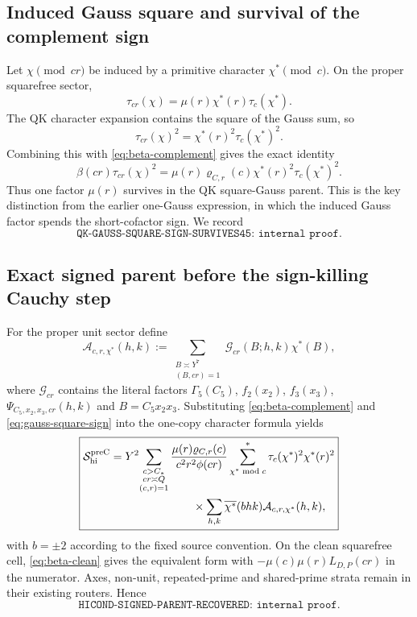 \documentclass[11pt]{article}
\theoremstyle{definition}
\newcommand{\1}{\mathbf 1}
\begin{document}
\subsection{Induced Gauss square and survival of the complement sign}

Let $\chi\pmod{cr}$ be induced by a primitive character
$\chi^*\pmod c$.  On the proper squarefree sector,
\begin{equation}
   \tau_{cr}(\chi)=\mu(r)\chi^*(r)\tau_c(\chi^*).
   \label{eq:induced-gauss}
\end{equation}
The QK character expansion contains the square of the Gauss sum, so
\[
   \tau_{cr}(\chi)^2
   =\chi^*(r)^2\tau_c(\chi^*)^2.
\]
Combining this with \eqref{eq:beta-complement} gives the exact identity
\begin{equation}
  \boxed{
  \beta(cr)\tau_{cr}(\chi)^2
   =
  \mu(r)\varrho_{C,r}(c)\chi^*(r)^2\tau_c(\chi^*)^2.
  }
  \label{eq:gauss-square-sign}
\end{equation}
Thus one factor $\mu(r)$ survives in the QK square-Gauss parent.  This is the
key distinction from the earlier one-Gauss expression, in which the induced
Gauss factor spends the short-cofactor sign.  We record
\[
 \boxed{\texttt{QK-GAUSS-SQUARE-SIGN-SURVIVES45: internal proof}.}
\]

\subsection{Exact signed parent before the sign-killing Cauchy step}

For the proper unit sector define
\[
 \mathcal A_{c,r,\chi^*}(h,k)
 :=
 \sum_{\substack{B\asymp Y^7\\(B,cr)=1}}
   \mathcal G_{cr}(B;h,k)\chi^*(B),
\]
where $\mathcal G_{cr}$ contains the literal factors
$\Gamma_5(C_5)$, $f_2(x_2)$, $f_3(x_3)$,
$\Psi_{C_5,x_2,x_3,cr}(h,k)$ and $B=C_5x_2x_3$.  Substituting
\eqref{eq:beta-complement} and \eqref{eq:gauss-square-sign} into the one-copy
character formula yields
\begin{equation}
\boxed{
\begin{aligned}
 \mathcal S_{\rm hi}^{\rm preC}
 ={}&
 Y^2\!\sum_{\substack{c>C_*\\cr\asymp Q\\(c,r)=1}}
 \frac{\mu(r)\varrho_{C,r}(c)}{c^2r^2\phi(cr)}
 \sum_{\chi^*\bmod c}^{*}
 \tau_c(\chi^*)^2\chi^*(r)^2  \\
 &\qquad\qquad\qquad\times
 \sum_{h,k}\overline{\chi^*}(bhk)
 \mathcal A_{c,r,\chi^*}(h,k),
\end{aligned}}
\label{eq:hicond-prec}
\end{equation}
with $b=\pm2$ according to the fixed source convention.  On the clean
squarefree cell, \eqref{eq:beta-clean} gives the equivalent form with
$-\mu(c)\mu(r)L_{D,P}(cr)$ in the numerator.  Axes, non-unit,
repeated-prime and shared-prime strata remain in their existing routers.
Hence
\[
  \boxed{\texttt{HICOND-SIGNED-PARENT-RECOVERED: internal proof}.}
\]
\end{document}
